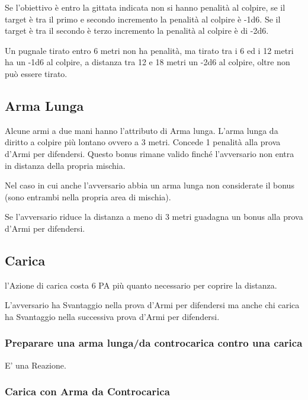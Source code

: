 \documentclass[12pt,a4paper,twoside,openany]{book}
\begin{document}
\begin{multicols}{2}
Se l'obiettivo è entro la gittata indicata non si hanno penalità al colpire, se il target è tra il primo e secondo incremento la penalità al colpire è -1d6. Se il target è tra il secondo è terzo incremento la penalità al colpire è di -2d6.

Un pugnale tirato entro 6 metri non ha penalità, ma tirato tra i 6 ed i 12 metri ha un -1d6 al colpire, a distanza tra 12 e 18 metri un -2d6 al colpire, oltre non può essere tirato.

\subsection{Arma Lunga} \label{armalunga}

Alcune armi a due mani hanno l'attributo di Arma lunga. L'arma lunga da diritto a colpire più lontano ovvero a 3 metri. Concede 1 penalità alla prova d'Armi per difendersi. Questo bonus rimane valido finché l'avversario non entra in distanza della propria mischia.

Nel caso in cui anche l'avversario abbia un arma lunga non considerate il bonus (sono entrambi nella propria area di mischia).

Se l'avversario riduce la distanza a meno di 3 metri guadagna un bonus alla prova d'Armi per difendersi.

\subsection{Carica} \label{carica}

l'Azione di carica costa 6 PA più quanto necessario per coprire la distanza.

L'avversario ha Svantaggio nella prova d'Armi per difendersi ma anche chi carica ha Svantaggio nella successiva prova d'Armi per difendersi.

\subsubsection{Preparare una arma lunga/da controcarica contro una carica} \label{prepararearmalungacontrocarica}

E' una Reazione.

\subsubsection{Carica con Arma da Controcarica} \label{caricaarmadacontrocarica}


\end{multicols}
\end{document}
